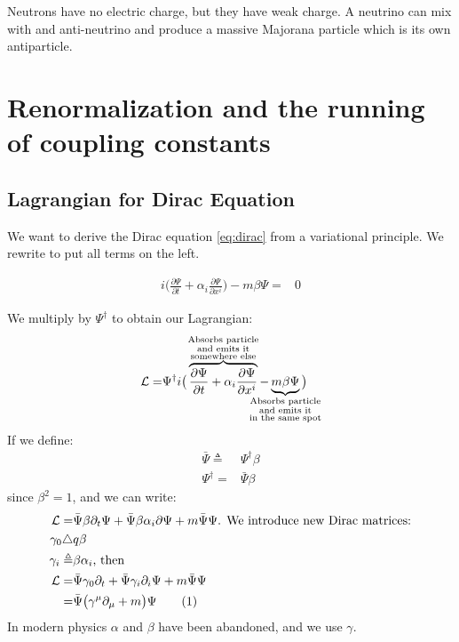 \documentclass[]{article}
\newcommand\numberthis{\addtocounter{equation}{1}\tag{\theequation}}
\begin{document}
Neutrons have no electric charge, but they have weak charge. A neutrino can mix with and anti-neutrino and produce a massive Majorana particle which is its own antiparticle.

\section{Renormalization and the running of coupling constants}

\subsection{Lagrangian for Dirac Equation}

We want to derive the Dirac equation \eqref{eq:dirac} from a variational principle. We rewrite to put all terms on the left.

\begin{align*}
	i \big(\frac{\partial \Psi}{\partial t} + \alpha_i \frac{\partial \Psi}{\partial x^i}\big) -m \beta \Psi =& 0
\end{align*}

We multiply by $\Psi^\dagger$ to obtain our Lagrangian:
\begin{align*}
	\mathcal{L}=&\Psi^\dagger i \big(\overbrace{\frac{\partial \Psi}{\partial t} + \alpha_i \frac{\partial \Psi}{\partial 	x^i}}^{\mathclap{\substack{\text{Absorbs particle}\\
				\text{and emits it}\\
			\text{somewhere else}}}}  - \underbrace{m \beta \Psi}_{\mathclap{\substack{\text{Absorbs particle}\\\text{and emits it}\\\text{in the same spot}}}}\big)
\end{align*}
If we define:
\begin{align*}
	\bar{\Psi} \triangleq&\Psi^\dagger \beta  \\
	\Psi^\dagger  =& \bar{\Psi} \beta 
\end{align*}
since $\beta^2=1$, and we can write:
\begin{align*}
	\mathcal{L} =& \bar{\Psi}\beta \partial_t \Psi+ \bar{\Psi}\beta \alpha_i \partial \Psi +m \bar{\Psi}  \Psi \text{. We introduce new Dirac matrices:}\\
	\gamma_0 \triangle&q \beta\\
	\gamma_i\triangleq&\beta \alpha_i \text{, then}\\
	\mathcal{L} =& \bar{\Psi}\gamma_0 \partial_t + \bar{\Psi}\gamma_i \partial_i \Psi +m \bar{\Psi}  \Psi\\
	=& \bar{\Psi}\big(\gamma^\mu \partial_\mu +m  \big) \Psi  \numberthis \label{eq:dirac:lagrange}
\end{align*}
In modern physics $\alpha$ and $\beta$ have been abandoned, and we use $\gamma$.
\end{document}
